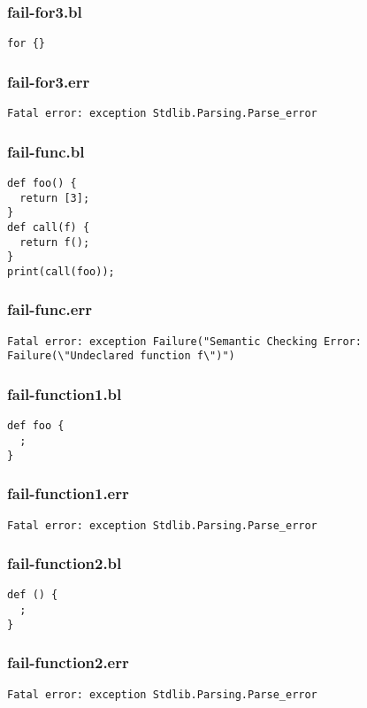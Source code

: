 \subsubsection{fail-for3.bl}
\begin{lstlisting}
for {}\end{lstlisting}
\subsubsection{fail-for3.err}
\begin{lstlisting}
Fatal error: exception Stdlib.Parsing.Parse_error
\end{lstlisting}
\subsubsection{fail-func.bl}
\begin{lstlisting}
def foo() {
  return [3];
}
def call(f) {
  return f();
}
print(call(foo));\end{lstlisting}
\subsubsection{fail-func.err}
\begin{lstlisting}
Fatal error: exception Failure("Semantic Checking Error: Failure(\"Undeclared function f\")")
\end{lstlisting}
\subsubsection{fail-function1.bl}
\begin{lstlisting}
def foo {
  ;
}\end{lstlisting}
\subsubsection{fail-function1.err}
\begin{lstlisting}
Fatal error: exception Stdlib.Parsing.Parse_error
\end{lstlisting}
\subsubsection{fail-function2.bl}
\begin{lstlisting}
def () {
  ;
}\end{lstlisting}
\subsubsection{fail-function2.err}
\begin{lstlisting}
Fatal error: exception Stdlib.Parsing.Parse_error
\end{lstlisting}
